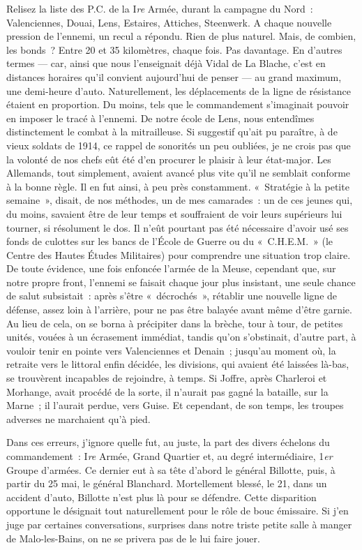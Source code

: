 \documentclass[french,twoside]{book} %
\begin{document}
Relisez la liste des P.C. de la I\emph{re} Armée, durant la campagne du Nord : Valenciennes, Douai, Lens, Estaires, Attiches, Steenwerk. A chaque nouvelle pression de l’ennemi, un recul a répondu. Rien de plus naturel. Mais, de combien, les bonds ? Entre 20 et 35 kilomètres, chaque fois. Pas davantage. En d’autres termes — car, ainsi que nous l’enseignait déjà Vidal de La Blache, c’est en distances horaires qu’il convient aujourd’hui de penser — au grand maximum, une demi-heure d’auto. Naturellement, les déplacements de la ligne de résistance étaient en proportion. Du moins, tels que le commandement s’imaginait pouvoir en imposer le tracé à l’ennemi. De notre école de Lens, nous entendîmes distinctement le combat à la mitrailleuse. Si suggestif qu’ait pu paraître, à de vieux soldats de 1914, ce rappel de sonorités un peu oubliées, je ne crois pas que la volonté de nos chefs eût été d’en procurer le plaisir à leur état-major. Les Allemands, tout simplement, avaient avancé plus vite qu’il ne semblait conforme à la bonne règle. Il en fut ainsi, à peu près constamment. « Stratégie à la petite semaine », disait, de nos méthodes, un de mes camarades : un de ces jeunes qui, du moins, savaient être de leur temps et souffraient de voir leurs supérieurs lui tourner, si résolument le dos. Il n’eût pourtant pas été nécessaire d’avoir usé ses fonds de culottes sur les bancs de l’École de Guerre ou du « C.H.E.M. » (le Centre   des Hautes Études Militaires) pour comprendre une situation trop claire. De toute évidence, une fois enfoncée l’armée de la Meuse, cependant que, sur notre propre front, l’ennemi se faisait chaque jour plus insistant, une seule chance de salut subsistait : après s’être « décrochés », rétablir une nouvelle ligne de défense, assez loin à l’arrière, pour ne pas être balayée avant même d’être garnie. Au lieu de cela, on se borna à précipiter dans la brèche, tour à tour, de petites unités, vouées à un écrasement immédiat, tandis qu’on s’obstinait, d’autre part, à vouloir tenir en pointe vers Valenciennes et Denain ; jusqu’au moment où, la retraite vers le littoral enfin décidée, les divisions, qui avaient été laissées là-bas, se trouvèrent incapables de rejoindre, à temps. Si Joffre, après Charleroi et Morhange, avait procédé de la sorte, il n’aurait pas gagné la bataille, sur la Marne ; il l’aurait perdue, vers Guise. Et cependant, de son temps, les troupes adverses ne marchaient qu’à pied.\par
Dans ces erreurs, j’ignore quelle fut, au juste, la part des divers échelons du commandement : I\emph{re} Armée, Grand Quartier et, au degré intermédiaire, 1\emph{er} Groupe d’armées. Ce dernier eut à sa tête d’abord le général Billotte, puis, à partir du 25 mai, le général Blanchard. Mortellement blessé, le 21, dans un accident d’auto, Billotte n’est plus là pour se défendre. Cette disparition opportune le désignait tout naturellement pour le rôle de bouc émissaire. Si j’en juge par certaines conversations, surprises dans notre triste petite salle à manger de Malo-les-Bains, on ne se privera pas de le lui faire jouer.\par
\end{document}
